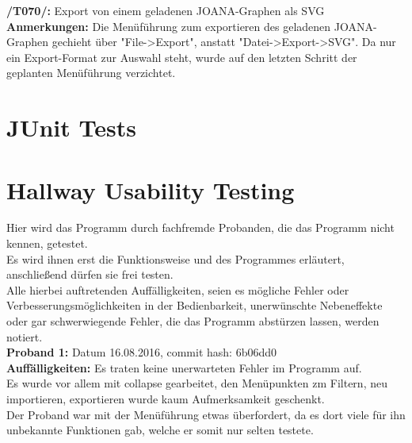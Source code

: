 \textbf{/T070/: }Export von einem geladenen JOANA-Graphen als SVG\\
\textbf{Anmerkungen: }Die Menüführung zum exportieren des geladenen JOANA-Graphen gechieht über "File->Export", anstatt "Datei->Export->SVG". Da nur ein Export-Format zur Auswahl steht, wurde auf den letzten Schritt der geplanten Menüführung verzichtet.\\


\section{JUnit Tests}


\section{Hallway Usability Testing}
Hier wird das Programm durch fachfremde Probanden, die das Programm nicht kennen, getestet.\\
Es wird ihnen erst die Funktionsweise und des Programmes erläutert, anschließend dürfen sie frei testen.\\
Alle hierbei auftretenden Auffälligkeiten, seien es mögliche Fehler oder Verbesserungsmöglichkeiten in der Bedienbarkeit, unerwünschte Nebeneffekte oder gar schwerwiegende Fehler, die das Programm abstürzen lassen, werden notiert.\\

\textbf{Proband 1: } Datum 16.08.2016, commit hash: 6b06dd0\\
\textbf{Auffälligkeiten: } Es traten keine unerwarteten Fehler im Programm auf.\\
Es wurde vor allem mit collapse gearbeitet, den Menüpunkten zm Filtern, neu importieren, exportieren wurde kaum Aufmerksamkeit geschenkt.\\
Der Proband war mit der Menüführung etwas überfordert, da es dort viele für ihn unbekannte Funktionen gab, welche er somit nur selten testete.

